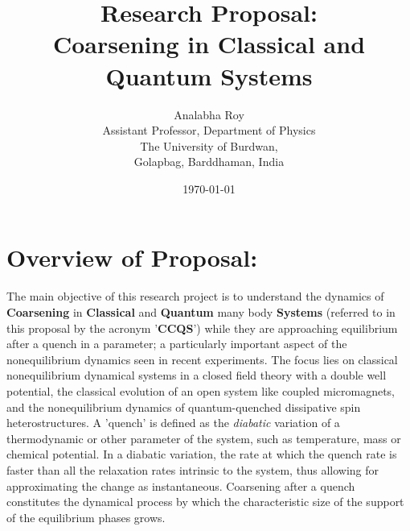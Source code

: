 \documentclass[a4paper,11pt,color]{article}
\title{Research Proposal:\\Coarsening in Classical and Quantum Systems}
\author{Analabha Roy\\Assistant Professor, Department of Physics\\ The University of Burdwan,\\ Golapbag, Barddhaman, India}
\date{\today}
\begin{document}
 \maketitle


\section{Overview of Proposal:}
\label{sec:sciTec}
\label{sec:sciTecQuality}

The main objective of this research project is to understand the dynamics of \textbf{Coarsening} in \textbf{Classical} and \textbf{Quantum} many body \textbf{Systems} (referred to in this proposal by the acronym '\textbf{CCQS}') while they are approaching equilibrium after a quench in a  {parameter}; a particularly important aspect of the nonequilibrium dynamics seen in recent experiments. The focus lies on classical nonequilibrium dynamical systems in a closed field theory with a double well potential, the classical evolution of an open system like coupled micromagnets, and the nonequilibrium dynamics of quantum-quenched dissipative spin heterostructures. A 'quench' is defined as the \textit{diabatic} variation of a thermodynamic or other  {parameter} of the system, such as temperature, mass or chemical potential. In a diabatic variation, the rate at which the quench rate is faster than all the relaxation rates intrinsic to the system, thus allowing for approximating the change as instantaneous. Coarsening after a quench constitutes the dynamical process by which the characteristic  {size} of the support of the equilibrium phases grows.
\end{document}
